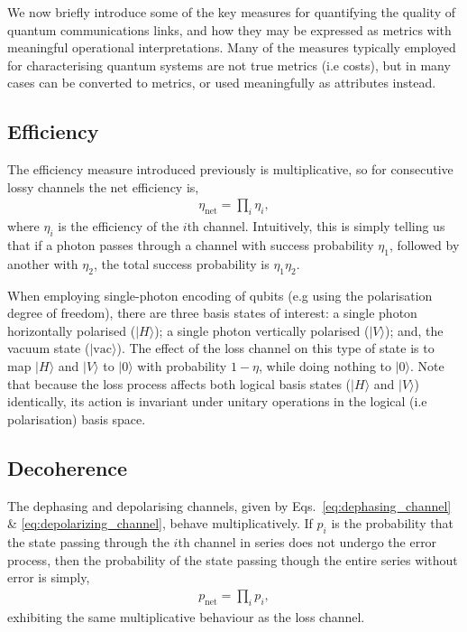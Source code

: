 \documentclass[aps,rmp,twocolumn,amsmath,amssymb,nofootinbib,superscriptaddress,longbibliography,floatfix]{revtex4-1}
\newcommand{\ket}[1]{|#1\rangle}
\begin{document}
We now briefly introduce some of the key measures for quantifying the quality of quantum communications links, and how they may be expressed as metrics with meaningful operational interpretations. Many of the measures typically employed for characterising quantum systems are not true metrics (i.e costs), but in many cases can be converted to metrics, or used meaningfully as attributes instead.

%
%

\subsection{Efficiency}

The efficiency measure introduced previously is multiplicative, so for consecutive lossy channels the net efficiency is,
\begin{align}
\eta_\mathrm{net}=\prod_i \eta_i,
\end{align}
where $\eta_i$ is the efficiency of the $i$th channel. Intuitively, this is simply telling us that if a photon passes through a channel with success probability $\eta_1$, followed by another with $\eta_2$, the total success probability is \mbox{$\eta_1\eta_2$}.

When employing single-photon encoding of qubits (e.g using the polarisation degree of freedom), there are three basis states of interest: a single photon horizontally polarised ($\ket{H}$); a single photon vertically polarised ($\ket{V}$); and, the vacuum state ($\ket{\mathrm{vac}}$). The effect of the loss channel on this type of state is to map $\ket{H}$ and $\ket{V}$ to $\ket{\mathrm{0}}$ with probability \mbox{$1-\eta$}, while doing nothing to $\ket{\mathrm{0}}$. Note that because the loss process affects both logical basis states ($\ket{H}$ and $\ket{V}$) identically, its action is invariant under unitary operations in the logical (i.e polarisation) basis space.

%
%

\subsection{Decoherence}

The dephasing and depolarising channels, given by Eqs.~\ref{eq:dephasing_channel} \& \ref{eq:depolarizing_channel}, behave multiplicatively. If $p_i$ is the probability that the state passing through the $i$th channel in series does not undergo the error process, then the probability of the state passing though the entire series without error is simply,
\begin{align}
p_\mathrm{net}=\prod_i p_i,
\end{align}
exhibiting the same multiplicative behaviour as the loss channel.
\end{document}
